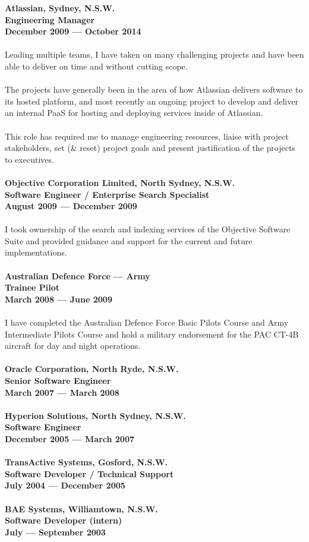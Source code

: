 \documentclass[a4paper]{article}
\begin{document}
\textbf{Atlassian, Sydney, N.S.W.\\Engineering Manager\\December 2009 --- October 2014}\\\\
Leading multiple teams, I have taken on many challenging projects and have been able to deliver on time and without cutting scope.
\\\\The projects have generally been in the area of how Atlassian delivers software to its hosted platform, and most recently an ongoing project to develop and deliver an internal PaaS for hosting and deploying services inside of Atlassian.
\\\\
This role has required me to manage engineering resources, liaise with project stakeholders, set (\& reset) project goals and present justification of the projects to executives.
\\\\
\textbf{Objective Corporation Limited, North Sydney, N.S.W.\\Software Engineer / Enterprise Search Specialist\\August 2009 --- December 2009}\\\\
I took ownership of the search and indexing services of the Objective Software Suite and provided guidance and support for the current and future implementations.\\\\
\textbf{Australian Defence Force --- Army\\Trainee Pilot\\March 2008 --- June 2009}\\\\
I have completed the Australian Defence Force Basic Pilots Course and Army Intermediate Pilots Course and hold a military endorsement for the PAC CT-4B aircraft for day and night operations.\\\\
\textbf{Oracle Corporation, North Ryde, N.S.W.\\Senior Software Engineer\\March 2007 --- March 2008}\\\\
\textbf{Hyperion Solutions, North Sydney, N.S.W.\\Software Engineer\\December 2005 --- March 2007} \\\\
\textbf{TransActive Systems, Gosford, N.S.W.\\Software Developer / Technical Support\\July 2004 --- December 2005}\\\\
\textbf{BAE Systems, Williamtown, N.S.W.\\Software Developer (intern)\\July --- September 2003}
\pagebreak
\ryanHeaderSmall
\end{document}
